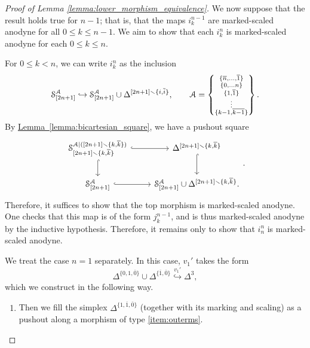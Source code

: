 \documentclass[main.tex]{subfiles}
\begin{document}
\begin{proof}[Proof of Lemma \ref{lemma:lower_morphism_equivalence}]
  We now suppose that the result holds true for $n-1$; that is, that the maps $i^{n-1}_{k}$ are marked-scaled anodyne for all $0 \leq k \leq n-1$. We aim to show that each $i^{n}_{k}$ is marked-scaled anodyne for each $0 \leq k \leq n$.

  For $0 \leq k < n$, we can write $i^{n}_{k}$ as the inclusion
  \begin{equation*}
    \S^{\mathcal{A}}_{[2n+1]} \hookrightarrow \S^{\mathcal{A}}_{[2n+1]} \cup \Delta^{[2n+1] \smallsetminus \{i, \overline{i}\}},\qquad \mathcal{A}
    = \left\{ \substack{ \{\overline{n}, \ldots, \overline{1}\} \\ \{0, \ldots n\} \\ \{1, \overline{1}\} \\ \vdots \\ \{k-1, \overline{k-1}\} } \right\}.
  \end{equation*}
  By \hyperref[lemma:bicartesian_square]{Lemma~\ref*{lemma:bicartesian_square}}, we have a pushout square
  \begin{equation*}
    \begin{tikzcd}
      \S^{\mathcal{A}|([2n+1] \smallsetminus \{k, \overline{k}\})}_{[2n+1] \smallsetminus \{k, \overline{k}\}}
      \arrow[r, hook]
      \arrow[d, hook]
      & \Delta^{[2n+1] \smallsetminus \{k, \overline{k}\}}
      \arrow[d, hook]
      \\
      \S^{\mathcal{A}}_{[2n+1]}
      \arrow[r, hook]
      & \S^{\mathcal{A}}_{[2n+1]} \cup \Delta^{[2n+1] \smallsetminus \{k, \overline{k}\}}.
    \end{tikzcd}.
  \end{equation*}
  Therefore, it suffices to show that the top morphism is marked-scaled anodyne. One checks that this map is of the form $j^{n-1}_{k}$, and is thus marked-scaled anodyne by the inductive hypothesis. Therefore, it remains only to show that $i^{n}_{n}$ is marked-scaled anodyne.

  We treat the case $n = 1$ separately. In this case, $v_{1}'$ takes the form
  \begin{equation*}
    \Delta^{\{0,1,\overline{0}\}} \cup \Delta^{\{\overline{1},\overline{0}\}} \overset{v_{1}'}{\hookrightarrow} \Delta^{3},
  \end{equation*}
  which we construct in the following way.
  \begin{enumerate}
    \item Then we fill the simplex $\Delta^{\{1,\overline{1},\overline{0}\}}$ (together with its marking and scaling) as a pushout along a morphism of type \ref{item:outerms}.


\end{enumerate}
\end{proof}
\end{document}
